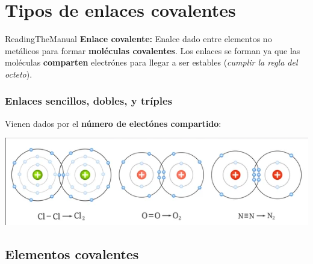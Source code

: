 \documentclass{book}
\begin{document}
\chapter{Tipos de enlaces covalentes}

\begin{Definition}{}{ReadingTheManual}
  \textbf{Enlace covalente:} Enalce dado entre elementos no metálicos para formar \textbf{moléculas covalentes}. Los enlaces se forman ya que las moléculas \textbf{comparten} 
  electrónes para llegar a ser estables (\textit{cumplir la regla del octeto}).
\end{Definition}

\subsection{Enlaces sencillos, dobles, y tríples}

Vienen dados por el \textbf{número de electónes compartido}:

\includegraphics[scale=0.70]{enlaces-por-complejidad.png}

\section{Elementos covalentes}
\end{document}
